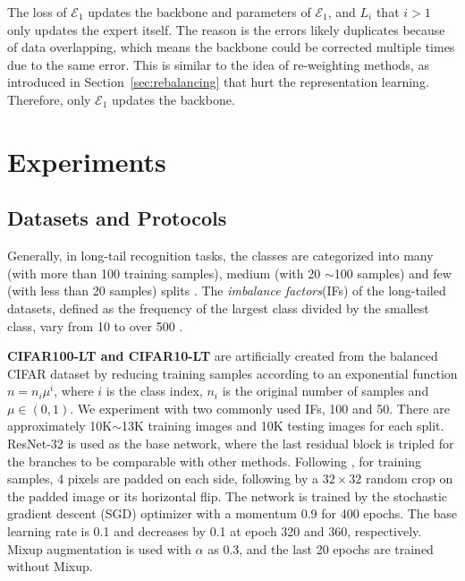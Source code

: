 The loss of $\mathcal{E}_1$ updates the backbone and parameters of $\mathcal{E}_1$, and $L_{i}$ that $i>1$ only updates the expert itself. The reason is the errors likely duplicates because of data overlapping, which means the backbone could be corrected multiple times due to the same error. This is similar to the idea of re-weighting methods, as introduced in Section~\ref{sec:rebalancing} that hurt the representation learning. Therefore, only $\mathcal{E}_1$ updates the backbone.

\section{Experiments}
\subsection{Datasets and Protocols}
Generally, in long-tail recognition tasks, the classes are categorized into many (with more than 100 training samples), medium (with 20 $\sim$100 samples) and few (with less than 20 samples) splits \cite{liu2019large}. The \textit{imbalance factors}(IFs) of the long-tailed datasets, defined as the frequency of the largest class divided by the smallest class, vary from 10 to over 500 \cite{cui2019class, liu2019large, van2018inaturalist}.

\textbf{CIFAR100-LT and CIFAR10-LT} \cite{cui2019class} are artificially created from the balanced CIFAR dataset \cite{krizhevsky2009learning} by reducing training samples according to an exponential function $n = n_i \mu^i$, where $i$ is the class index, $n_i$ is the original number of samples and $\mu \in (0,1)$. We experiment with two commonly used IFs, 100 and 50. There are approximately 10K$\sim$13K training images and 10K testing images for each split. ResNet-32 is used as the base network, where the last residual block is tripled for the branches to be comparable with other methods. Following \cite{he2016deep}, for training samples, 4 pixels are padded on each side, following by a $32 \times 32$ random crop on the padded image or its horizontal flip. The network is trained by the stochastic gradient descent (SGD) optimizer with a momentum 0.9 for 400 epochs. The base learning rate is 0.1 and decreases by 0.1 at epoch 320 and 360, respectively. Mixup \cite{zhang2017mixup} augmentation is used with $\alpha$ as 0.3, and the last 20 epochs are trained without Mixup.

